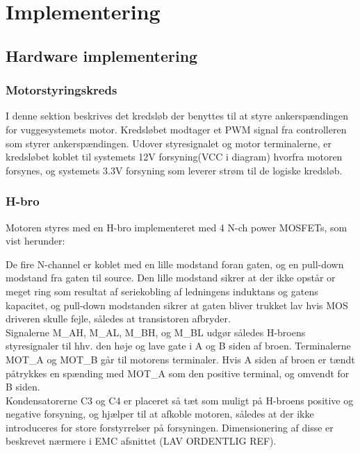 \section{Implementering}

\subsection{Hardware implementering}

\subsubsection{Motorstyringskreds}
I denne sektion beskrives det kredsløb der benyttes til at styre ankerspændingen for vuggesystemets motor. Kredsløbet modtager et PWM signal fra controlleren som styrer ankerspændingen. Udover styresignalet og motor terminalerne, er kredsløbet koblet til systemets 12V forsyning(VCC i diagram) hvorfra motoren forsynes, og systemets 3.3V forsyning som leverer strøm til de logiske kredsløb.\\


\subsubsection*{H-bro}
Motoren styres med en H-bro implementeret med 4 N-ch power MOSFETs, som vist herunder:


De fire N-channel er koblet med en lille modstand foran gaten, og en pull-down modstand fra gaten til source. Den lille modstand sikrer at der ikke opstår or meget ring som resultat af seriekobling af ledningens induktans og gatens kapacitet, og pull-down modstanden sikrer at gaten bliver trukket lav hvis MOS driveren skulle fejle, således at transistoren afbryder. \\ 
Signalerne M\_AH, M\_AL, M\_BH, og M\_BL udgør således H-broens styresignaler til hhv. den høje og lave gate i A og B siden af broen. Terminalerne MOT\_A og MOT\_B går til motorens terminaler. Hvis A siden af broen er tændt påtrykkes en spænding med MOT\_A som den positive terminal, og omvendt for B siden. \\
Kondensatorerne C3 og C4 er placeret så tæt som muligt på H-broens positive og negative forsyning, og hjælper til at afkoble motoren, således at der ikke introduceres for store forstyrrelser på forsyningen. Dimensionering af disse er beskrevet nærmere i EMC afsnittet (LAV ORDENTLIG REF).\\

